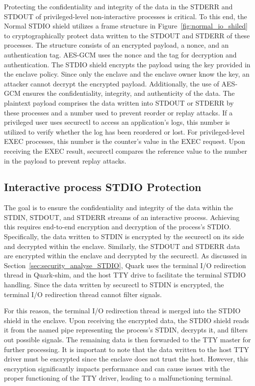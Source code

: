 Protecting the confidentiality and integrity of the data in the STDERR and STDOUT of privileged-level non-interactive processes is critical. To this end, the Normal STDIO shield utilizes a frame structure in Figure~\ref{fig:normal_io_shiled} to cryptographically protect data written to the STDOUT and STDERR of these processes. The structure consists of an 
encrypted payload, a nonce, and an authentication tag. AES-GCM uses the nonce and the tag for decryption and authentication. The STDIO shield encrypts the payload using the key provided in the enclave policy. Since only the enclave and the enclave owner know the key, an attacker cannot decrypt the encrypted payload. Additionally, the use of AES-GCM ensures the 
confidentiality, integrity, and authenticity of the data. The plaintext payload comprises the data written into STDOUT or STDERR by these processes and a number used to prevent reorder or replay attacks. If a privileged user uses securectl to access an application’s logs, this number is utilized to verify whether the log has been reordered or lost. 
For privileged-level EXEC processes, this number is the counter’s value in the EXEC request. Upon receiving the EXEC result, securectl compares the reference value to the number in the payload to prevent replay attacks.


\subsection{Interactive process STDIO Protection}
\label{subsec:design_terminal}


The goal is to ensure the confidentiality and integrity of the data within the STDIN, STDOUT, and STDERR streams of an interactive process. Achieving this requires end-to-end encryption and decryption of the process's STDIO. Specifically, the data written to STDIN is encrypted by the securectl on its side and decrypted within the enclave. Similarly, 
the STDOUT and STDERR data are encrypted within the enclave and decrypted by the securectl. As discussed in Section~\ref{sec:security_analyse_STDIO}, Quark uses the terminal I/O redirection thread in Quark-shim, and the host TTY drive to facilitate the terminal STDIO handling. Since the data written by securectl to STDIN is encrypted, the terminal I/O redirection thread 
cannot filter signals.

For this reason, the terminal I/O redirection thread is merged into the STDIO shield in the enclave. Upon receiving the encrypted data, the STDIO shield reads it from the named pipe representing the process's STDIN, decrypts it, and filters out possible signals. The remaining data is then forwarded to the TTY master for further processing. It is important 
to note that the data written to the host TTY driver must be encrypted since the enclave does not trust the host. However, this encryption significantly impacts performance and can cause issues with the proper functioning of the TTY driver, leading to a malfunctioning terminal.

